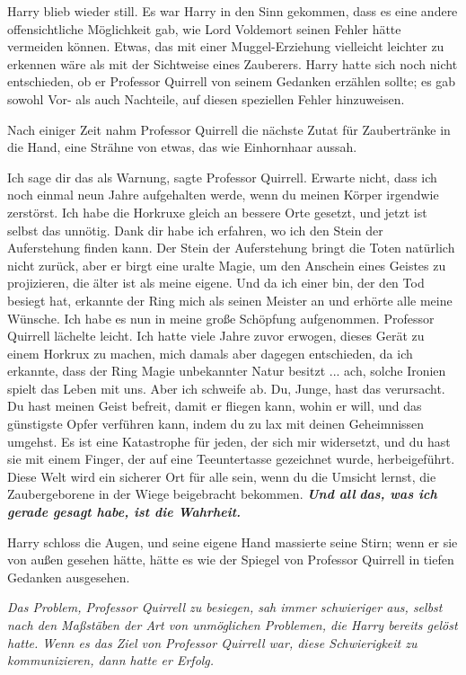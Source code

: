 Harry blieb wieder still. Es war Harry in den Sinn gekommen, dass es eine andere
offensichtliche Möglichkeit gab, wie Lord Voldemort seinen Fehler hätte
vermeiden können. Etwas, das mit einer Muggel-Erziehung vielleicht leichter zu
erkennen wäre als mit der Sichtweise eines Zauberers. Harry hatte sich noch
nicht entschieden, ob er Professor Quirrell von seinem Gedanken erzählen sollte;
es gab sowohl Vor- als auch Nachteile, auf diesen speziellen Fehler hinzuweisen.

Nach einiger Zeit nahm Professor Quirrell die nächste Zutat für Zaubertränke in
die Hand, eine Strähne von etwas, das wie Einhornhaar aussah.

\glqq{}Ich sage dir das als Warnung\grqq{}, sagte Professor Quirrell. \glqq{}
Erwarte nicht, dass ich noch einmal neun Jahre aufgehalten werde, wenn du meinen
Körper irgendwie zerstörst. Ich habe die Horkruxe gleich an bessere Orte
gesetzt, und jetzt ist selbst das unnötig. Dank dir habe ich erfahren, wo ich
den Stein der Auferstehung finden kann. Der Stein der Auferstehung bringt die
Toten natürlich nicht zurück, aber er birgt eine uralte Magie, um den Anschein
eines Geistes zu projizieren, die älter ist als meine eigene. Und da ich einer
bin, der den Tod besiegt hat, erkannte der Ring mich als seinen Meister an und
erhörte alle meine Wünsche. Ich habe es nun in meine große Schöpfung
aufgenommen.\grqq{} Professor Quirrell lächelte leicht. \glqq{}Ich hatte viele Jahre
zuvor erwogen, dieses Gerät zu einem Horkrux zu machen, mich damals aber dagegen
entschieden, da ich erkannte, dass der Ring Magie unbekannter Natur besitzt ...
ach, solche Ironien spielt das Leben mit uns. Aber ich schweife ab. Du, Junge,
hast das verursacht. Du hast meinen Geist befreit, damit er fliegen kann, wohin
er will, und das günstigste Opfer verführen kann, indem du zu lax mit deinen
Geheimnissen umgehst. Es ist eine Katastrophe für jeden, der sich mir
widersetzt, und du hast sie mit einem Finger, der auf eine Teeuntertasse
gezeichnet wurde, herbeigeführt. Diese Welt wird ein sicherer Ort für alle sein,
wenn du die Umsicht lernst, die Zaubergeborene in der Wiege beigebracht
bekommen. \textbf{\emph{Und all} }\textbf{\emph{das, was ich gerade gesagt habe,
ist die Wahrheit.}}\grqq{}

Harry schloss die Augen, und seine eigene Hand massierte seine Stirn; wenn er
sie von außen gesehen hätte, hätte es wie der Spiegel von Professor Quirrell in
tiefen Gedanken ausgesehen.

\emph{Das Problem, Professor Quirrell zu besiegen, sah immer schwieriger aus,
selbst nach den Maßstäben der Art von unmöglichen Problemen, die Harry bereits
gelöst hatte. Wenn es das Ziel von Professor Quirrell war, diese Schwierigkeit
zu kommunizieren, dann hatte er Erfolg.}

